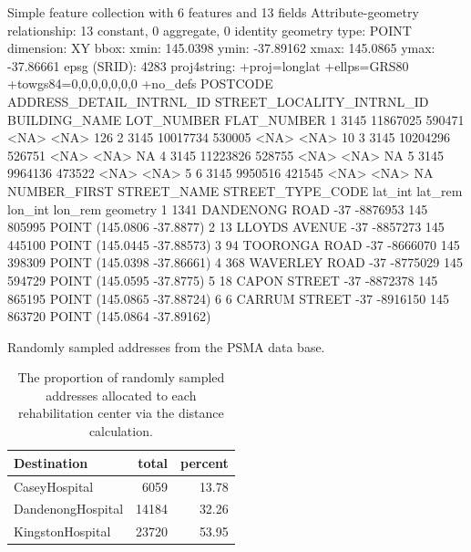 \documentclass[utf8]{frontiersHLTH}
\begin{document}
\begin{table}[h]
\begin{verbnobox}[\fontsize{8pt}{8pt}\selectfont]
Simple feature collection with 6 features and 13 fields
Attribute-geometry relationship: 13 constant, 0 aggregate, 0 identity
geometry type:  POINT
dimension:      XY
bbox:           xmin: 145.0398 ymin: -37.89162 xmax: 145.0865 ymax: -37.86661
epsg (SRID):    4283
proj4string:    +proj=longlat +ellps=GRS80 +towgs84=0,0,0,0,0,0,0 +no_defs
  POSTCODE ADDRESS_DETAIL_INTRNL_ID STREET_LOCALITY_INTRNL_ID BUILDING_NAME LOT_NUMBER FLAT_NUMBER
1     3145                 11867025                    590471          <NA>       <NA>         126
2     3145                 10017734                    530005          <NA>       <NA>          10
3     3145                 10204296                    526751          <NA>       <NA>          NA
4     3145                 11223826                    528755          <NA>       <NA>          NA
5     3145                  9964136                    473522          <NA>       <NA>           5
6     3145                  9950516                    421545          <NA>       <NA>          NA
  NUMBER_FIRST STREET_NAME STREET_TYPE_CODE lat_int  lat_rem lon_int lon_rem                   geometry
1         1341   DANDENONG             ROAD     -37 -8876953     145  805995  POINT (145.0806 -37.8877)
2           13      LLOYDS           AVENUE     -37 -8857273     145  445100 POINT (145.0445 -37.88573)
3           94    TOORONGA             ROAD     -37 -8666070     145  398309 POINT (145.0398 -37.86661)
4          368    WAVERLEY             ROAD     -37 -8775029     145  594729  POINT (145.0595 -37.8775)
5           18       CAPON           STREET     -37 -8872378     145  865195 POINT (145.0865 -37.88724)
6            6      CARRUM           STREET     -37 -8916150     145  863720 POINT (145.0864 -37.89162)
\end{verbnobox}
\caption{Randomly sampled addresses from the PSMA data base.\label{tab:headpsma}}
\end{table}

\begin{table}[h]
\begin{tabular}{l|r|r}
\hline
Destination & total & percent\\
\hline
CaseyHospital & 6059 & 13.78\\
\hline
DandenongHospital & 14184 & 32.26\\
\hline
KingstonHospital & 23720 & 53.95\\
\hline
\end{tabular}

\caption{The proportion of randomly sampled addresses allocated to each rehabilitation center via the distance calculation.\label{tab:rehabrandomassignment}}
\end{table}
\end{document}
